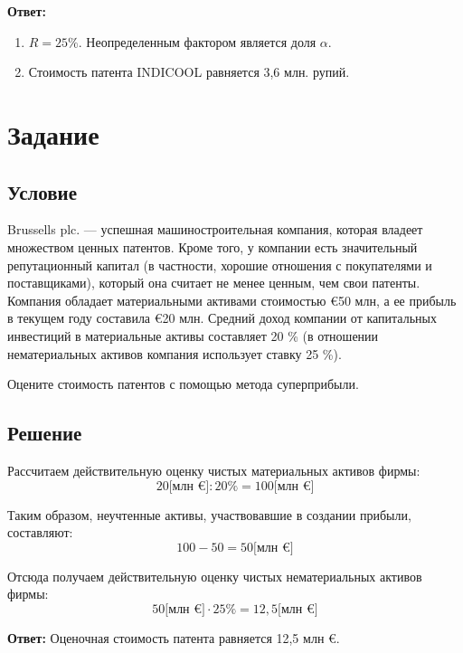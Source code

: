 \documentclass[12pt]{article}
\newenvironment{e}[1][dummy label]{
    \section{Задание}\label{#1}
    \subsection*{Условие}
    }{
    \subsection*{Решение}
}
\begin{document}
    \textbf{Ответ:} \begin{enumerate}
                        \item $R = 25 \%$. Неопределенным фактором является доля $\alpha$.
                        \item Стоимость патента INDICOOL равняется 3,6 млн. рупий.
    \end{enumerate}

    \newpage
    \begin{e}
        Brussells plc. --- успешная машиностроительная компания, которая владеет множеством ценных патентов. Кроме того, у компании есть значительный репутационный капитал (в частности, хорошие отношения с покупателями и поставщиками), который она считает не менее ценным, чем свои патенты. Компания обладает материальными активами стоимостью €50 млн, а ее прибыль в текущем году составила €20 млн. Средний доход компании от капитальных инвестиций в материальные активы составляет 20 \% (в отношении нематериальных активов компания использует ставку 25 \%).

        Оцените стоимость патентов с помощью метода суперприбыли.
    \end{e}

    Рассчитаем действительную оценку чистых материальных активов фирмы:
    \begin{equation}
        20 \big[\text{млн €}\big] : 20 \% = 100 \big[\text{млн €}\big]
    \end{equation}

    Таким образом, неучтенные активы, участвовавшие в создании прибыли, составляют:
    \begin{equation}
        100 - 50 = 50 \big[\text{млн €}\big]
    \end{equation}

    Отсюда получаем действительную оценку чистых нематериальных активов фирмы:
    \begin{equation}
        50 \big[\text{млн €}\big] \cdot 25 \% = 12,5 \big[\text{млн €}\big]
    \end{equation}

    \textbf{Ответ:} Оценочная стоимость патента равняется 12,5 млн €.
\end{document}
